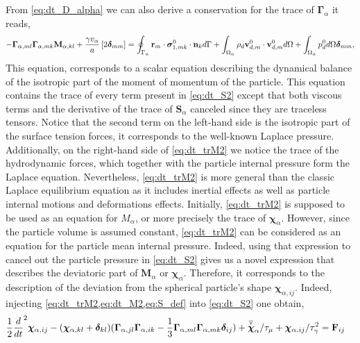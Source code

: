 From \ref{eq:dt_D_alpha} we can also derive a conservation for the trace of $\bm\Gamma_\alpha$ it reads, 
\begin{equation}
    -  \bm\Gamma_{\alpha,ml}\bm\Gamma_{\alpha,mk} \textbf{M}_{\alpha,kl}  
    + \frac{\gamma v_\alpha }{a} 
    \left[
    2\bm\delta_{mm} 
    \right]
    = 
    \intS{\textbf{r}_m\cdot\bm\sigma_{1,mk}^0\cdot \textbf{n}_k} 
    + \intO{\rho_d \textbf{v}_{d,m}^0\cdot \textbf{v}_{d,m}^0}
    + \intO{p_d^0} \bm\delta_{mm},
    \label{eq:dt_trM2}
\end{equation}
This equation, corresponds to a scalar equation describing the dynamical balance of the isotropic part of the moment of momentum of the particle. 
This equation contains the trace of every term present in \ref{eq:dt_S2} except that both viscous terms and the derivative of the trace of $\textbf{S}_\alpha$ canceled since they are traceless tensors. 
Notice that the second term on the left-hand side is the isotropic part of the surface tension forces, it corresponds to the well-known Laplace pressure. 
Additionally, on the right-hand side of \ref{eq:dt_trM2} we notice the trace of the hydrodynamic forces, which together with the particle internal pressure form the Laplace equation. 
Nevertheless, \ref{eq:dt_trM2} is more general than the classic Laplace equilibrium equation as it includes inertial effects as well as particle internal motions and deformations effects.  
Initially, \ref{eq:dt_trM2} is supposed to be used as an equation for $M_\alpha$, or more precisely the trace of $\bm\chi_\alpha$.
However, since the particle volume is assumed constant, \ref{eq:dt_trM2} can be considered as an equation for the particle mean internal pressure. 
Indeed, using that expression to cancel out the particle pressure in \ref{eq:dt_S2} gives us a novel expression that describes the deviatoric part of $\textbf{M}_\alpha$ or $\bm\chi_\alpha$.
Therefore, it corresponds to the description of the deviation from the spherical particle's shape $\bm\chi_{\alpha,ij}$. 
Indeed, injecting \ref{eq:dt_trM2,eq:dt_M2,eq:S_def} into  \ref{eq:dt_S2} one obtain, 
\begin{align}
        \frac{1}{2}\ddt^2 \bm\chi_{\alpha,ij}
        - (\bm\chi_{\alpha,kl} + \bm\delta_{kl})
        (\bm\Gamma_{\alpha,jl}\bm\Gamma_{\alpha,ik}  
        - \frac{1}{3}
        \bm\Gamma_{\alpha,ml}\bm\Gamma_{\alpha,mk}  
        \bm\delta_{ij}
        )
    &+ 
    \overset{ \triangledown  }{\bm\chi}_\alpha
    / \tau_\mu
    +
    \bm\chi_{\alpha,ij}
    / \tau_\gamma^2
    = 
    \textbf{F}_{ij}
    \label{eq:dev}
\end{align}
